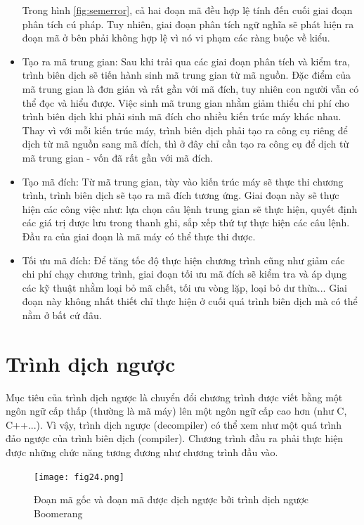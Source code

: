 \begin{itemize}
	Trong hình \ref{fig:semerror}, cả hai đoạn mã đều hợp lệ tính đến cuối giai đoạn phân tích cú pháp. Tuy nhiên, giai đoạn phân tích ngữ nghĩa sẽ phát hiện ra đoạn mã ở bên phải không hợp lệ vì nó vi phạm các ràng buộc về kiểu.
	
	\item Tạo ra mã trung gian: Sau khi trải qua các giai đoạn phân tích và kiểm tra, trình biên dịch sẽ tiến hành sinh mã trung gian từ mã nguồn. Đặc điểm của mã trung gian là đơn giản và rất gần với mã đích, tuy nhiên con người vẫn có thể đọc và hiểu được. Việc sinh mã trung gian nhằm giảm thiểu chi phí cho trình biên dịch khi phải sinh mã đích cho nhiều kiến trúc máy khác nhau. Thay vì với mỗi kiến trúc máy, trình biên dịch phải tạo ra công cụ riêng để dịch từ mã nguồn sang mã đích, thì ở đây chỉ cần tạo ra công cụ để dịch từ mã trung gian - vốn đã rất gần với mã đích.\\
	
	
	\item Tạo mã đích: Từ mã trung gian, tùy vào kiến trúc máy sẽ thực thi chương trình, trình biên dịch sẽ tạo ra mã đích tương ứng. Giai đoạn này sẽ thực hiện các công việc như: lựa chọn câu lệnh trung gian sẽ thực hiện, quyết định các giá trị được lưu trong thanh ghi, sắp xếp thứ tự thực hiện các câu lệnh. Đầu ra của giai đoạn là mã máy có thể thực thi được.
	
	
	\item Tối ưu mã đích: Để tăng tốc độ thực hiện chương trình cũng như giảm các chi phí chạy chương trình, giai đoạn tối ưu mã đích sẽ kiểm tra và áp dụng các kỹ thuật nhằm loại bỏ mã chết, tối ưu vòng lặp, loại bỏ dư thừa... Giai đoạn này không nhất thiết chỉ thực hiện ở cuối quá trình biên dịch mà có thể nằm ở bất cứ đâu.
\end{itemize}

\section{Trình dịch ngược}
Mục tiêu của trình dịch ngược \cite{reverseengineeer} là chuyển đổi chương trình được viết bằng một ngôn ngữ cấp thấp (thường là mã máy) lên một ngôn ngữ cấp cao hơn (như C, C++...). Vì vậy, trình dịch ngược (decompiler) có thể xem như một quá trình đảo ngược của trình biên dịch (compiler). Chương trình đầu ra phải thực hiện được những chức năng tương đương như chương trình đầu vào. \\

\begin{figure}[h]
	\centering
	\texttt{[image: fig24.png]}
	\caption{Đoạn mã gốc và đoạn mã được dịch ngược bởi trình dịch ngược Boomerang}
\end{figure}

